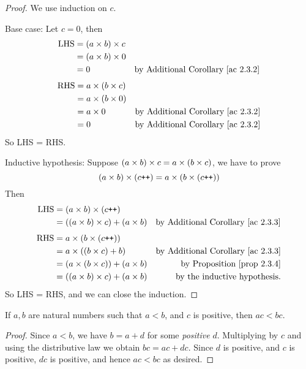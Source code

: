 \begin{proof}
We use induction on \(c\).

Base case: Let \(c = 0\), then
\begin{align*}
    \text{LHS} & = (a \X b) \X c \\
               & = (a \X b) \X 0 \\
               & = 0 & \text{by \AC{2.3.2}}
\end{align*}
\begin{align*}
    \text{RHS} & = a \X (b \X c) \\
               & = a \X (b \X 0) \\
               & = a \X 0 & \text{by \AC{2.3.2}} \\
               & = 0 & \text{by \AC{2.3.2}}
\end{align*}
So LHS = RHS.

Inductive hypothesis: Suppose \((a \times b) \times c = a \times (b \times c)\), we have to prove
\[(a \times b) \times (c\texttt{++}) = a \times (b \times (c\texttt{++}))\]
Then
\begin{align*}
    \text{LHS} & = (a \X b) \X (c\INC) \\
               & = ((a \X b) \X c) + (a \X b) & \text{by \AC{2.3.3}} \\
\end{align*}
\begin{align*}
    \text{RHS} & = a \X (b \X (c\INC)) \\
               & = a \X ((b \X c) + b) & \text{by \AC{2.3.3}} \\
               & = (a \X (b \X c)) + (a \X b) & \text{by \PROP{2.3.4}} \\
               & = ((a \X b) \X c) + (a \X b) & \text{by the inductive hypothesis}.
\end{align*}
So LHS = RHS, and we can close the induction.
\end{proof}

\begin{proposition}\label{prop 2.3.6}
If \(a, b\) are natural numbers such that \(a < b\), and \(c\) is positive, then \(ac < bc\).
\end{proposition}
\begin{proof}
Since \(a < b\), we have \(b = a + d\) for some \emph{positive} \(d\). Multiplying by \(c\) and using the distributive law we obtain \(bc = ac + dc\). Since \(d\) is positive, and \(c\) is positive, \(dc\) is positive, and hence \(ac < bc\) as desired.
\end{proof}

